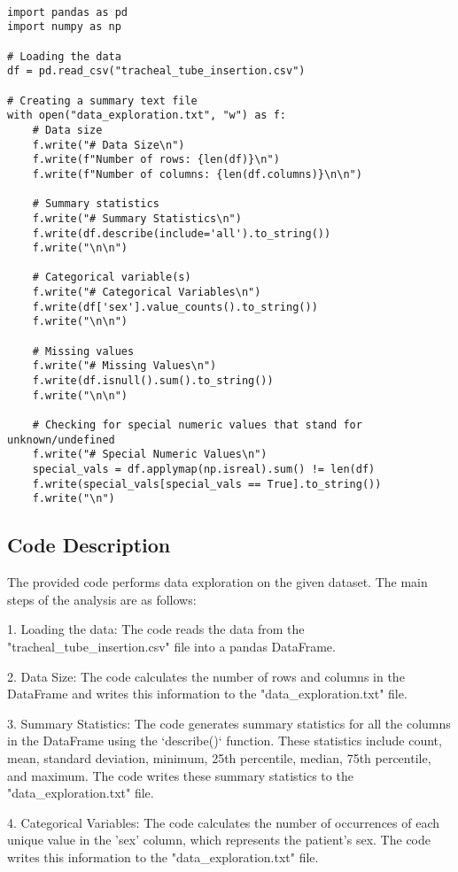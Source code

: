\documentclass[11pt]{article}
\begin{document}
\begin{verbatim}

import pandas as pd
import numpy as np

# Loading the data
df = pd.read_csv("tracheal_tube_insertion.csv")

# Creating a summary text file
with open("data_exploration.txt", "w") as f:
    # Data size
    f.write("# Data Size\n")
    f.write(f"Number of rows: {len(df)}\n")
    f.write(f"Number of columns: {len(df.columns)}\n\n")

    # Summary statistics
    f.write("# Summary Statistics\n")
    f.write(df.describe(include='all').to_string())
    f.write("\n\n")

    # Categorical variable(s)
    f.write("# Categorical Variables\n")
    f.write(df['sex'].value_counts().to_string())
    f.write("\n\n")

    # Missing values
    f.write("# Missing Values\n")
    f.write(df.isnull().sum().to_string())
    f.write("\n\n")

    # Checking for special numeric values that stand for unknown/undefined
    f.write("# Special Numeric Values\n")
    special_vals = df.applymap(np.isreal).sum() != len(df)
    f.write(special_vals[special_vals == True].to_string())
    f.write("\n")

\end{verbatim}

\subsection{Code Description}

The provided code performs data exploration on the given dataset. The main steps of the analysis are as follows:

1. Loading the data: The code reads the data from the "tracheal\_tube\_insertion.csv" file into a pandas DataFrame.

2. Data Size: The code calculates the number of rows and columns in the DataFrame and writes this information to the "data\_exploration.txt" file.

3. Summary Statistics: The code generates summary statistics for all the columns in the DataFrame using the `describe()` function. These statistics include count, mean, standard deviation, minimum, 25th percentile, median, 75th percentile, and maximum. The code writes these summary statistics to the "data\_exploration.txt" file.

4. Categorical Variables: The code calculates the number of occurrences of each unique value in the 'sex' column, which represents the patient's sex. The code writes this information to the "data\_exploration.txt" file.
\end{document}
